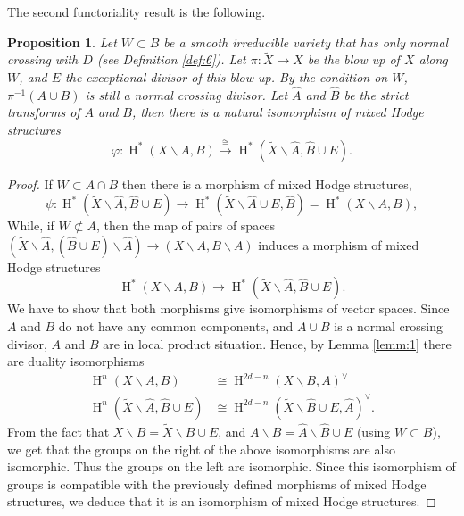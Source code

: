 \documentclass[11pt,a4paper]{amsart}
\DeclareMathOperator{\rH}{H}
\numberwithin{equation}{section}
\theoremstyle{plain}
\newtheorem{prop}{Proposition}[section]
\theoremstyle{definition}
\begin{document}
The second functoriality result is the following. 
\begin{prop}\label{prop:6}  Let $W\subset B$ be a smooth
  irreducible variety that has only normal crossing with $D$ (see
  Definition \ref{def:6}). Let
  $\pi\colon \widetilde X\rightarrow X$ be the blow up of $X$ along
  $W$, and $E$ the exceptional divisor of this blow up. By the
  condition on $W$,  $\pi^{-1}(A\cup B)$ is still a normal 
  crossing divisor. Let
  $\widehat A$ and $\widehat B$ be the strict transforms of $A$ and
  $B$, then there is a natural isomorphism of mixed Hodge structures
  \begin{equation}\label{eq:10}
    \varphi \colon \rH^{\ast}(X\smallsetminus A,B)
    \xrightarrow{\cong}
    \rH^{\ast}(\widetilde X\smallsetminus \widehat A,\widehat
    B\cup E).
  \end{equation}
\end{prop}
\begin{proof}
  If $W\subset A\cap B$ then there is a morphism of mixed Hodge structures, 
  \begin{displaymath}
    \psi\colon \rH^{\ast}(\widetilde X\smallsetminus \widehat A,\widehat
    B\cup E) \longrightarrow
    \rH^{\ast}(\widetilde X\smallsetminus \widehat A\cup E,\widehat
    B) =
    \rH^{\ast}(X\smallsetminus A,B),
  \end{displaymath}
  While, if $W\not \subset A$, then the map of pairs of spaces
  $(\widetilde X\smallsetminus \widehat A,(\widehat B\cup E)\smallsetminus
  \widehat A)\to (X\smallsetminus A,B\smallsetminus A)$ induces a morphism of
  mixed Hodge structures
  \begin{displaymath}
    \rH^{\ast}(X\smallsetminus A,B)
    \longrightarrow
    \rH^{\ast}(\widetilde X\smallsetminus \widehat A,\widehat B\cup E).
  \end{displaymath}
  We have to show that both morphisms give isomorphisms of vector
  spaces.  
Since $A$ and $B$ do not have any common components, and $A\cup B$ is
a normal crossing divisor, $A$ and $B$ are in local product
situation. Hence, by Lemma \ref{lemm:1} there are duality
isomorphisms 
\begin{align*}
  \rH^{n}(X\smallsetminus A, B)
  &\cong \rH^{2d-n}(X\smallsetminus B, A)^{\vee}\\
  \rH^{n}(\widetilde X\smallsetminus \widehat A, \widehat B\cup E)
  &\cong \rH^{2d-n}(\widetilde X\smallsetminus \widehat B\cup E, \widehat A)^{\vee}. 
\end{align*}
From the fact that $X\smallsetminus B = \widetilde {X}\smallsetminus
\widehat{B}\cup E$, and $A\smallsetminus B=\widehat{A}\smallsetminus
\widehat{B}\cup E$ (using $W\subset B$), we get that the groups on the
right of the above isomorphisms are also isomorphic. Thus the groups
on the left are isomorphic.  
Since this isomorphism of groups is compatible with the previously
defined  morphisms of mixed Hodge
structures, we deduce that  it is an isomorphism of mixed Hodge
structures.
\end{proof}
\end{document}
